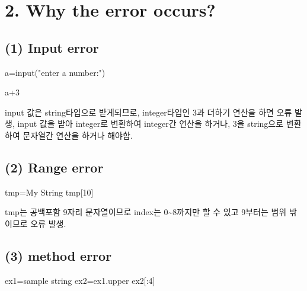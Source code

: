 \documentclass[
  letterpaper,
  DIV=11,
  numbers=noendperiod]{scrreprt}
\newenvironment{Shaded}{\begin{snugshade}}{\end{snugshade}}
\newcommand{\BuiltInTok}[1]{\textcolor[rgb]{0.00,0.23,0.31}{#1}}
\newcommand{\DecValTok}[1]{\textcolor[rgb]{0.68,0.00,0.00}{#1}}
\newcommand{\NormalTok}[1]{\textcolor[rgb]{0.00,0.23,0.31}{#1}}
\newcommand{\OperatorTok}[1]{\textcolor[rgb]{0.37,0.37,0.37}{#1}}
\newcommand{\StringTok}[1]{\textcolor[rgb]{0.13,0.47,0.30}{#1}}
\begin{document}
\section*{2. Why the error occurs?}\label{why-the-error-occurs}


\subsection*{(1) Input error}\label{input-error}

\begin{Shaded}
\begin{Highlighting}[]
\NormalTok{a}\OperatorTok{=}\BuiltInTok{input}\NormalTok{(}\StringTok{"enter a number:"}\NormalTok{)}

\NormalTok{a}\OperatorTok{+}\DecValTok{3}
\end{Highlighting}
\end{Shaded}

input 값은 string타입으로 받게되므로, integer타입인 3과 더하기 연산을
하면 오류 발생, input 값을 받아 integer로 변환하여 integer간 연산을
하거나, 3을 string으로 변환하여 문자열간 연산을 하거나 해야함.

\subsection*{(2) Range error}\label{range-error}

\begin{Shaded}
\begin{Highlighting}[]
\NormalTok{tmp}\OperatorTok{=}\StringTok{\textquotesingle{}My String\textquotesingle{}}
\NormalTok{tmp[}\DecValTok{10}\NormalTok{]}
\end{Highlighting}
\end{Shaded}

tmp는 공백포함 9자리 문자열이므로 index는 0\textasciitilde8까지만 할 수
있고 9부터는 범위 밖이므로 오류 발생.

\subsection*{(3) method error}\label{method-error}

\begin{Shaded}
\begin{Highlighting}[]
\NormalTok{ex1}\OperatorTok{=}\StringTok{\textquotesingle{}sample string\textquotesingle{}}
\NormalTok{ex2}\OperatorTok{=}\NormalTok{ex1.upper}
\NormalTok{ex2[:}\DecValTok{4}\NormalTok{]}
\end{Highlighting}
\end{Shaded}
\end{document}
